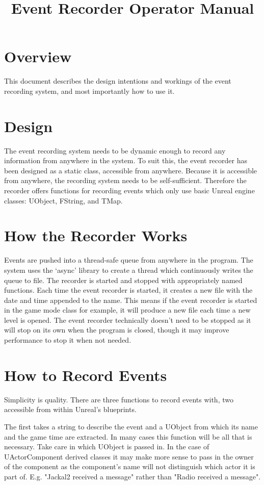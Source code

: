 \documentclass[../main.tex]{subfiles}
\title{Event Recorder Operator Manual}
\begin{document}
\section{Overview}
This document describes the design intentions and workings of the event recording system, and most importantly how to use it.

\section{Design}
The event recording system needs to be dynamic enough to record any information from anywhere in the system.
To suit this, the event recorder has been designed as a static class, accessible from anywhere.
Because it is accessible from anywhere, the recording system needs to be self-sufficient.
Therefore the recorder offers functions for recording events which only use basic Unreal engine classes: UObject, FString, and TMap.

\section{How the Recorder Works}
Events are pushed into a thread-safe queue from anywhere in the program.
The system uses the `async' library to create a thread which continuously writes the queue to file.
The recorder is started and stopped with appropriately named functions.
Each time the event recorder is started, it creates a new file with the date and time appended to the name.
This means if the event recorder is started in the game mode class for example, it will produce a new file each time a new level is opened.
The event recorder technically doesn't need to be stopped as it will stop on its own when the program is closed, though it may improve performance to stop it when not needed.

\section{How to Record Events}
Simplicity is quality.
There are three functions to record events with, two accessible from within Unreal's blueprints.

The first takes a string to describe the event and a UObject from which its name and the game time are extracted.
In many cases this function will be all that is necessary.
Take care in which UObject is passed in.
In the case of UActorComponent derived classes it may make more sense to pass in the owner of the component as the component's name will not distinguish which actor it is part of.
E.g. "Jackal2 received a message" rather than "Radio received a message".
\end{document}
